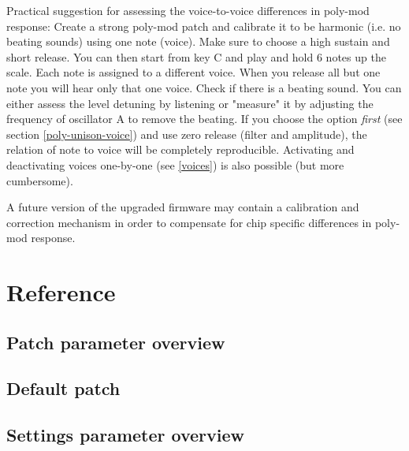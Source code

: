 \documentclass[landscape, 11pt, oneside, twoside]{report}
\newenvironment{flowtext}{\addmargin[0cm]{0cm}}{\endaddmargin} %
\begin{document}
\begin{flowtext}
Practical suggestion for assessing the voice-to-voice differences in poly-mod response: Create a strong poly-mod patch and calibrate it to be harmonic (i.e. no beating sounds) using one note (voice). Make sure to choose a high sustain and short release. You can then start from key C and play and hold 6 notes up the scale. Each note is assigned to a different voice. When you release all but one note you will hear only that one voice. Check if there is a beating sound. You can either assess the level detuning by listening or "measure" it by adjusting the frequency of oscillator A to remove the beating. If you choose the \assign option \textit{first} (see section \ref{poly-unison-voice}) and use zero release (filter and amplitude), the relation of note to voice will be completely reproducible. Activating and deactivating voices one-by-one (see \ref{voices}) is also possible (but more cumbersome).

A future version of the upgraded firmware may contain a calibration and correction mechanism in order to compensate for chip specific differences in poly-mod response.  

\end{flowtext}

\pagebreak
\chapter{Reference}

\begin{flowtext}

\section{Patch parameter overview}\label{patchref}



\pagebreak
\section{Default patch}\label{defaultpatch}



\pagebreak
\section{Settings parameter overview}\label{settingsref}



\end{flowtext}
\end{document}
